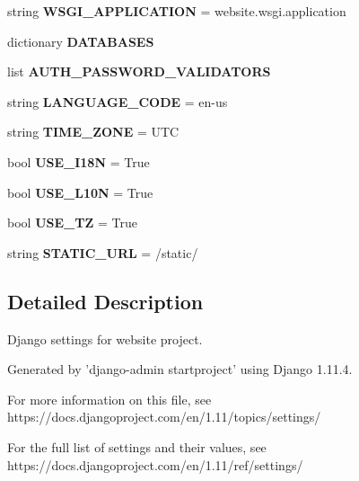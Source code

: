 \begin{DoxyCompactItemize}
string {\bfseries W\+S\+G\+I\+\_\+\+A\+P\+P\+L\+I\+C\+A\+T\+I\+ON} = \textquotesingle{}website.\+wsgi.\+application\textquotesingle{}
\item 
dictionary {\bfseries D\+A\+T\+A\+B\+A\+S\+ES}
\item 
list {\bfseries A\+U\+T\+H\+\_\+\+P\+A\+S\+S\+W\+O\+R\+D\+\_\+\+V\+A\+L\+I\+D\+A\+T\+O\+RS}
\item 
\mbox{\label{namespacewebsite_1_1settings_ad456600caf349e185ed63642f175f9d6}} 
string {\bfseries L\+A\+N\+G\+U\+A\+G\+E\+\_\+\+C\+O\+DE} = \textquotesingle{}en-\/us\textquotesingle{}
\item 
\mbox{\label{namespacewebsite_1_1settings_a50911b8e4c92d5a4c64286d67ec1527d}} 
string {\bfseries T\+I\+M\+E\+\_\+\+Z\+O\+NE} = \textquotesingle{}U\+TC\textquotesingle{}
\item 
\mbox{\label{namespacewebsite_1_1settings_a0145c045bb6758971a05bbc409aceeda}} 
bool {\bfseries U\+S\+E\+\_\+\+I18N} = True
\item 
\mbox{\label{namespacewebsite_1_1settings_aded5f4d81b3fd20f6d1f5dbfbf866987}} 
bool {\bfseries U\+S\+E\+\_\+\+L10N} = True
\item 
\mbox{\label{namespacewebsite_1_1settings_a8436340aefb064185063a3960956f2ec}} 
bool {\bfseries U\+S\+E\+\_\+\+TZ} = True
\item 
\mbox{\label{namespacewebsite_1_1settings_a9995cbf4bb3633a357c2ad418b8981e9}} 
string {\bfseries S\+T\+A\+T\+I\+C\+\_\+\+U\+RL} = \textquotesingle{}/static/\textquotesingle{}
\end{DoxyCompactItemize}


\subsection{Detailed Description}
\begin{DoxyVerb}Django settings for website project.

Generated by 'django-admin startproject' using Django 1.11.4.

For more information on this file, see
https://docs.djangoproject.com/en/1.11/topics/settings/

For the full list of settings and their values, see
https://docs.djangoproject.com/en/1.11/ref/settings/
\end{DoxyVerb}
 

